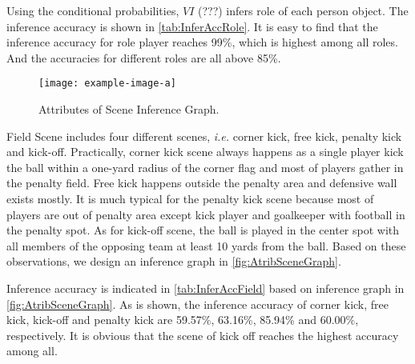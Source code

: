 Using the conditional probabilities, $VI$ {\color{red}(???)} infers role of each person object. The inference accuracy is shown in \autoref{tab:InferAccRole}. It is easy to find that the inference accuracy for role player reaches 99\%, which is highest among all roles. And the accuracies for different roles are all above 85\%.




\begin{figure}[!bth]
	\centering	
	\begin{minipage}[b]{\linewidth}
		\centerline{\texttt{[image: example-image-a]}}
	\end{minipage}\hfill
	\caption{Attributes of Scene Inference Graph.}
	\label{fig:AtribSceneGraph}
\end{figure}

Field Scene includes four different scenes, \textit{i.e.} corner kick, free kick, penalty kick and kick-off. Practically, corner kick scene always happens as a single player kick the ball within a one-yard radius of the corner flag and most of players gather in the penalty field. Free kick happens outside the penalty area and defensive wall exists mostly. It is much typical for the penalty kick scene because most of players are out of penalty area except kick player and goalkeeper with football in the penalty spot. As for kick-off scene, the ball is played in the center spot with all members of the opposing team at least 10 yards from the ball. Based on these observations, we design an inference graph in \autoref{fig:AtribSceneGraph}.


Inference accuracy is indicated in \autoref{tab:InferAccField} based on inference graph in \autoref{fig:AtribSceneGraph}. As is shown, the inference accuracy of corner kick, free kick, kick-off and penalty kick are 59.57\%, 63.16\%, 85.94\% and 60.00\%, respectively. It is obvious that the scene of kick off reaches the highest accuracy among all.
 

